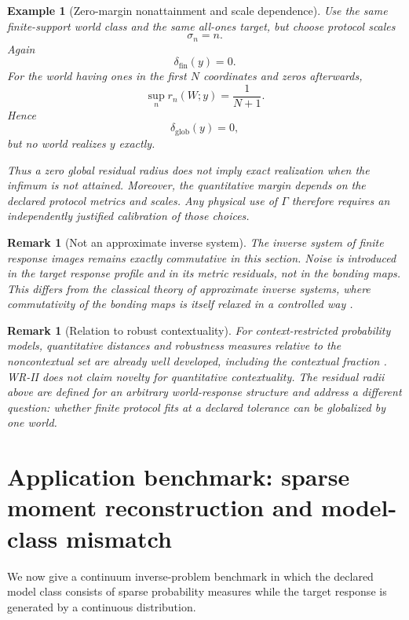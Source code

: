\documentclass[11pt]{article}
\newtheorem{example}[definition]{Example}
\newtheorem{remark}[definition]{Remark}
\begin{document}
\begin{example}[Zero-margin nonattainment and scale dependence]
Use the same finite-support world class and the same all-ones target, but choose
protocol scales
\[
\sigma_n=n.
\]
Again
\[
\delta_{\mathrm{fin}}(y)=0.
\]
For the world having ones in the first $N$ coordinates and zeros afterwards,
\[
\sup_n r_n(W;y)
=
\frac{1}{N+1}.
\]
Hence
\[
\delta_{\mathrm{glob}}(y)=0,
\]
but no world realizes $y$ exactly.

Thus a zero global residual radius does not imply exact realization when the
infimum is not attained. Moreover, the quantitative margin depends on the
declared protocol metrics and scales. Any physical use of $\Gamma$ therefore
requires an independently justified calibration of those choices.
\end{example}

\begin{remark}[Not an approximate inverse system]
The inverse system of finite response images remains exactly commutative in
this section. Noise is introduced in the target response profile and in its
metric residuals, not in the bonding maps. This differs from the classical
theory of approximate inverse systems, where commutativity of the bonding
maps is itself relaxed in a controlled way
\cite{MardesicRubin1989,MardesicSegal1989}.
\end{remark}

\begin{remark}[Relation to robust contextuality]
For context-restricted probability models, quantitative distances and
robustness measures relative to the noncontextual set are already well
developed, including the contextual fraction
\cite{AbramskyBarbosaMansfield2017}. WR-II does not claim novelty for
quantitative contextuality. The residual radii above are defined for an
arbitrary world-response structure and address a different question: whether
finite protocol fits at a declared tolerance can be globalized by one world.
\end{remark}



\section{Application benchmark: sparse moment reconstruction and model-class mismatch}
\label{sec:moment-benchmark}

We now give a continuum inverse-problem benchmark in which the declared model
class consists of sparse probability measures while the target response is
generated by a continuous distribution.
\end{document}
